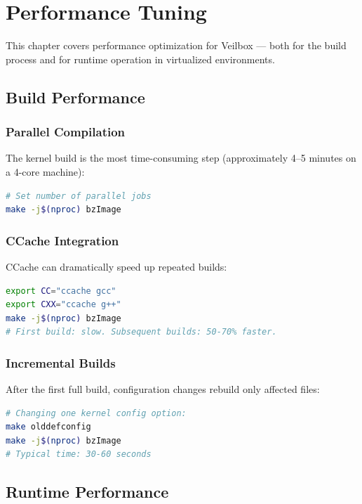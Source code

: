 \chapter{Performance Tuning}
\label{ch:performance}

This chapter covers performance optimization for Veilbox — both for the
build process and for runtime operation in virtualized environments.

\section{Build Performance}

\subsection{Parallel Compilation}

The kernel build is the most time-consuming step (approximately 4--5
minutes on a 4-core machine):

\begin{lstlisting}[language=bash]
# Set number of parallel jobs
make -j$(nproc) bzImage
\end{lstlisting}

\subsection{CCache Integration}

CCache can dramatically speed up repeated builds:

\begin{lstlisting}[language=bash]
export CC="ccache gcc"
export CXX="ccache g++"
make -j$(nproc) bzImage
# First build: slow. Subsequent builds: 50-70% faster.
\end{lstlisting}

\subsection{Incremental Builds}

After the first full build, configuration changes rebuild only affected
files:

\begin{lstlisting}[language=bash]
# Changing one kernel config option:
make olddefconfig
make -j$(nproc) bzImage
# Typical time: 30-60 seconds
\end{lstlisting}

\section{Runtime Performance}

